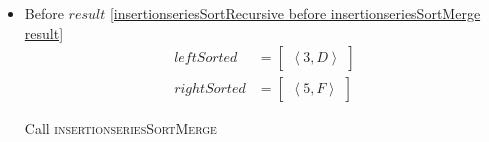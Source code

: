 \begin{frame}[containsverbatim]{\insertionseriesexampleframe}
\begin{columns}[c]
\begin{column}{0.6\textwidth}
{\begin{minipage}[c]{\textwidth}
\begin{multicols}{3}
\begin{itemize}
                                    \item Before $result$ \cref{insertionseriesSortRecursive before insertionseriesSortMerge result}
                                    \begin{align*}
                                        leftSorted & = \begin{bmatrix}\left<3, D\right>\end{bmatrix} \\
                                        rightSorted & = \begin{bmatrix}\left<5, F\right>\end{bmatrix}
                                    \end{align*}
        
                                    Call \textsc{insertionseriesSortMerge}
                                \end{itemize}
                            \end{multicols}
                        \end{minipage}
                    }
                \end{column}
            \end{columns}
        \end{frame}

